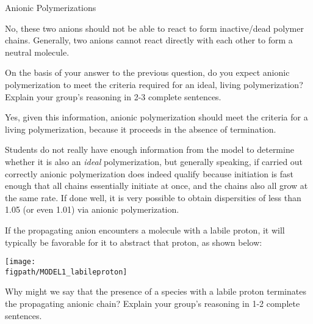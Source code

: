 \begin{activity}{Anionic Polymerizations}
\begin{ctqs}
		\begin{solution}[1.25in]{}
			No, these two anions should not be able to react to form inactive/dead polymer chains.  Generally, two anions cannot react directly with each other to form a neutral molecule.
		\end{solution}
	
	\question On the basis of your answer to the previous question, do you expect anionic polymerization to meet the criteria required for an ideal, living polymerization?  Explain your group's reasoning in 2-3 complete sentences.
	
		\begin{solution}[1.25in]{}
			Yes, given this information, anionic polymerization should meet the criteria for a living polymerization, because it proceeds in the absence of termination.
			
			Students do not really have enough information from the model to determine whether it is also an \textit{ideal} polymerization, but generally speaking, if carried out correctly anionic polymerization does indeed qualify because initiation is fast enough that all chains essentially initiate at once, and the chains also all grow at the same rate.  If done well, it is very possible to obtain dispersities of less than 1.05 (or even 1.01) via anionic polymerization.
		\end{solution}

\end{ctqs}

\begin{infobox}

	If the propagating anion encounters a molecule with a labile proton, it will typically be favorable for it to abstract that proton, as shown below:
	
	\centerline{\texttt{[image: \\figpath/MODEL1\_labileproton]}}
	
\end{infobox}

\begin{ctqs}
	
	
	\question Why might we say that the presence of a species with a labile proton terminates the propagating anionic chain?  Explain your group's reasoning in 1-2 complete sentences.
	

\end{ctqs}
\end{activity}
